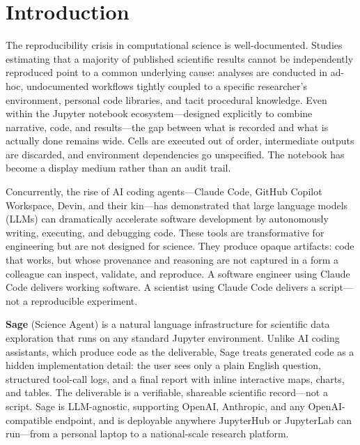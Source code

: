 \documentclass[10pt,twocolumn]{article}
\begin{document}
\section{Introduction}

The reproducibility crisis in computational science is well-documented. Studies estimating that a majority of published scientific results cannot be independently reproduced point to a common underlying cause: analyses are conducted in ad-hoc, undocumented workflows tightly coupled to a specific researcher's environment, personal code libraries, and tacit procedural knowledge. Even within the Jupyter notebook ecosystem---designed explicitly to combine narrative, code, and results---the gap between what is recorded and what is actually done remains wide. Cells are executed out of order, intermediate outputs are discarded, and environment dependencies go unspecified. The notebook has become a display medium rather than an audit trail.

Concurrently, the rise of AI coding agents---Claude Code, GitHub Copilot Workspace, Devin, and their kin---has demonstrated that large language models (LLMs) can dramatically accelerate software development by autonomously writing, executing, and debugging code. These tools are transformative for engineering but are not designed for science. They produce opaque artifacts: code that works, but whose provenance and reasoning are not captured in a form a colleague can inspect, validate, and reproduce. A software engineer using Claude Code delivers working software. A scientist using Claude Code delivers a script---not a reproducible experiment.

\textbf{Sage} (Science Agent) is a natural language infrastructure for scientific data exploration that runs on any standard Jupyter environment. Unlike AI coding assistants, which produce code as the deliverable, Sage treats generated code as a hidden implementation detail: the user sees only a plain English question, structured tool-call logs, and a final report with inline interactive maps, charts, and tables. The deliverable is a verifiable, shareable scientific record---not a script. Sage is LLM-agnostic, supporting OpenAI, Anthropic, and any OpenAI-compatible endpoint, and is deployable anywhere JupyterHub or JupyterLab can run---from a personal laptop to a national-scale research platform.
\end{document}

